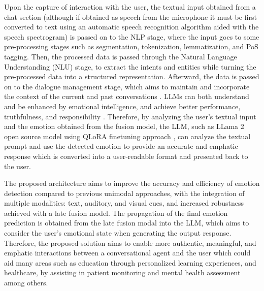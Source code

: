 \documentclass[runningheads]{llncs}
\begin{document}
Upon the capture of interaction with the user, the textual input obtained from a chat section (although if obtained as speech from the microphone it must be first converted to text using an automatic speech recognition algorithm aided with the speech spectrogram) is passed on to the NLP stage, where the input goes to some pre-processing stages such as segmentation, tokenization, lemmatization, and PoS tagging. Then, the processed data is passed through the Natural Language Understanding (NLU) stage, to extract the intents and entities while turning the pre-processed data into a structured representation. Afterward, the data is passed on to the dialogue management stage, which aims to maintain and incorporate the context of the current and past conversations \cite{rizou_multilingual_2022}. LLMs can both understand and be enhanced by emotional intelligence, and achieve better performance, truthfulness, and responsibility \cite{li_large_2023}. Therefore, by analyzing the user's textual input and the emotion obtained from the fusion model, the LLM, such as LLama 2 open source model using QLoRA finetuning approach \cite{Dettmers2023}, can analyze the textual prompt and use the detected emotion to provide an accurate and emphatic response which is converted into a user-readable format and presented back to the user.

The proposed architecture aims to improve the accuracy and efficiency of emotion detection compared to previous unimodal approaches, with the integration of multiple modalities: text, auditory, and visual cues, and increased robustness achieved with a late fusion model. The propagation of the final emotion prediction is obtained from the late fusion modal into the LLM, which aims to consider the user's emotional state when generating the output response.
Therefore, the proposed solution aims to enable more authentic, meaningful, and emphatic interactions between a conversational agent and the user which could aid many areas such as education through personalized learning experiences, and healthcare, by assisting in patient monitoring and mental health assessment among others.

\end{document}
